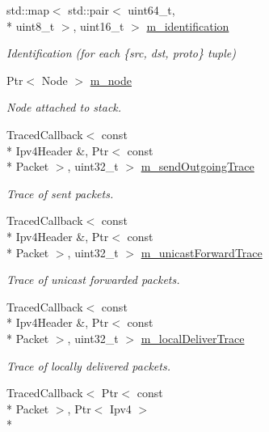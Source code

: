 \begin{DoxyCompactItemize}
std\-::map$<$ std\-::pair$<$ uint64\-\_\-t, \\*
uint8\-\_\-t $>$, uint16\-\_\-t $>$ \hyperlink{classns3_1_1Ipv4RouterL3Protocol_ab2a9c6993c29edc51d8b474e48abebc0}{m\-\_\-identification}
\begin{DoxyCompactList}\small\item\em Identification (for each \{src, dst, proto\} tuple) \end{DoxyCompactList}\item 
Ptr$<$ Node $>$ \hyperlink{classns3_1_1Ipv4RouterL3Protocol_ab30fadcb1d2a60537c41092b9f722bab}{m\-\_\-node}
\begin{DoxyCompactList}\small\item\em Node attached to stack. \end{DoxyCompactList}\item 
Traced\-Callback$<$ const \\*
Ipv4\-Header \&, Ptr$<$ const \\*
Packet $>$, uint32\-\_\-t $>$ \hyperlink{classns3_1_1Ipv4RouterL3Protocol_a43fe32063af9622684b6567a6319ac73}{m\-\_\-send\-Outgoing\-Trace}
\begin{DoxyCompactList}\small\item\em Trace of sent packets. \end{DoxyCompactList}\item 
Traced\-Callback$<$ const \\*
Ipv4\-Header \&, Ptr$<$ const \\*
Packet $>$, uint32\-\_\-t $>$ \hyperlink{classns3_1_1Ipv4RouterL3Protocol_aa4866fa965886a7eebb4a8c3d3ca06f6}{m\-\_\-unicast\-Forward\-Trace}
\begin{DoxyCompactList}\small\item\em Trace of unicast forwarded packets. \end{DoxyCompactList}\item 
Traced\-Callback$<$ const \\*
Ipv4\-Header \&, Ptr$<$ const \\*
Packet $>$, uint32\-\_\-t $>$ \hyperlink{classns3_1_1Ipv4RouterL3Protocol_a3bc277d7e84b260398a08beef734ef8e}{m\-\_\-local\-Deliver\-Trace}
\begin{DoxyCompactList}\small\item\em Trace of locally delivered packets. \end{DoxyCompactList}\item 
Traced\-Callback$<$ Ptr$<$ const \\*
Packet $>$, Ptr$<$ Ipv4 $>$\\*

\end{DoxyCompactItemize}
